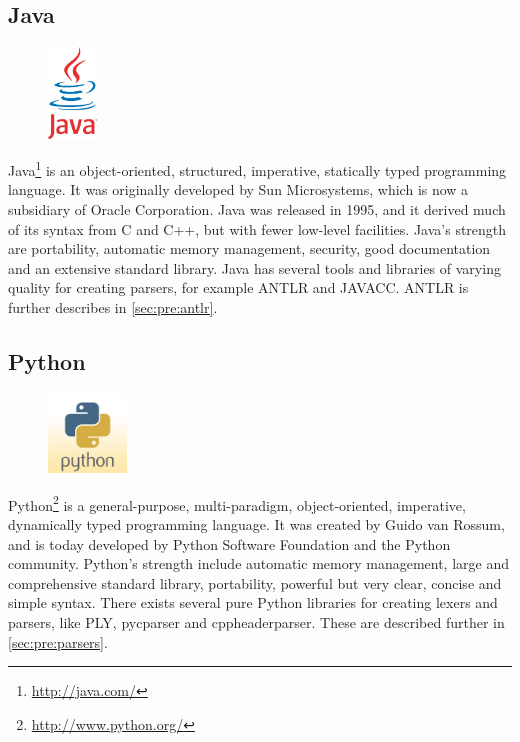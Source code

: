 \subsection{Java}
\begin{figure}
	\begin{center}
	\vspace{-30pt}
		\includegraphics[width=1.3cm]{./planning/img/java_logo}
	\vspace{-30pt}
	\end{center}
\end{figure}
Java\footnote{\url{http://java.com/}} is an object-oriented, structured,
imperative, statically typed programming language. It was originally developed
by Sun Microsystems, which is now a subsidiary of Oracle Corporation. Java was
released in 1995, and it derived much of its syntax from C and C++, but with
fewer low-level facilities. Java’s strength are portability, automatic memory
management, security, good documentation and an extensive standard library.
Java has several tools and libraries of varying quality for creating parsers,
for example ANTLR and JAVACC. ANTLR is further describes in 
\autoref{sec:pre:antlr}.

\subsection{Python}
\begin{figure}
	\begin{center}
	\vspace{-30pt}
		\includegraphics[width=2.1cm]{./planning/img/python_logo}
	\vspace{-30pt}
	\end{center}
\end{figure}
Python\footnote{\url{http://www.python.org/}} is a general-purpose,
multi-paradigm, object-oriented, imperative, dynamically typed programming
language. It was created by Guido van Rossum, and is today developed by Python
Software Foundation and the Python community. Python’s strength include
automatic memory management, large and comprehensive standard library,
portability, powerful but very clear, concise and simple syntax. There exists
several pure Python libraries for creating lexers and parsers, like PLY,
pycparser and cppheaderparser. These are described further in
\autoref{sec:pre:parsers}.


